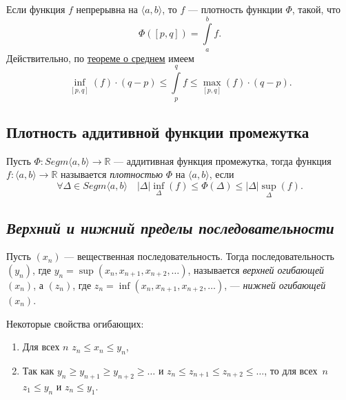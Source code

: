 \begin{example}
	Если функция \(f\) непрерывна на \(\langle a, b \rangle\), то \(f\) --- плотность функции \(\Phi\), такой, что \[
		\Phi([p, q]) = \int\limits_a^b f.
	\]
	Действительно, по \hyperlink{sredneye}{теореме о среднем} имеем\[
		\inf_{[p, q]} (f) \cdot (q - p) \leqslant \int\limits_p^q f \leqslant \max_{[p, q]} (f) \cdot (q - p).
	\]
\end{example}

\subsection{Плотность аддитивной функции промежутка}

\begin{definition}
	Пусть \(\Phi \colon Segm \langle a, b \rangle \to \mathbb{R}\) --- аддитивная функция промежутка, тогда функция \(f: \langle a, b \rangle \to \mathbb{R}\) называется \textit{плотностью} \(\Phi\) на \(\langle a, b \rangle\), если \[
	\forall \Delta \in Segm \langle a, b \rangle \quad |\Delta| \inf_\Delta(f) \leqslant \Phi(\Delta) \leqslant |\Delta| \sup_\Delta(f).
	\]
	
\end{definition}

\subsection{\itshape Верхний и нижний пределы последовательности}

\begin{ndefinition}
	Пусть \((x_n)\) --- вещественная последовательность. Тогда последовательность \((y_n)\), где \(y_n = \sup (x_n, x_{n + 1}, x_{n + 2}, \ldots)\), называется \textit{верхней огибающей} \((x_n)\), а \((z_n)\), где \(z_n = \inf (x_n, x_{n + 1}, x_{n + 2}, \ldots)\), --- \textit{нижней огибающей} \((x_n)\).
\end{ndefinition}

\begin{remark}
	Некоторые свойства огибающих:
	\begin{enumerate}
		\item Для всех \(n\) \(z_n \leqslant x_n \leqslant y_n\),
		\item Так как \(y_n \geqslant y_{n + 1} \geqslant y_{n + 2} \geqslant \ldots\) и \(z_n \leqslant z_{n + 1} \leqslant z_{n + 2} \leqslant \ldots\), то для всех~\(n\) \(z_1 \leqslant y_n\) и \(z_n \leqslant y_1\).
	\end{enumerate}
\end{remark}

